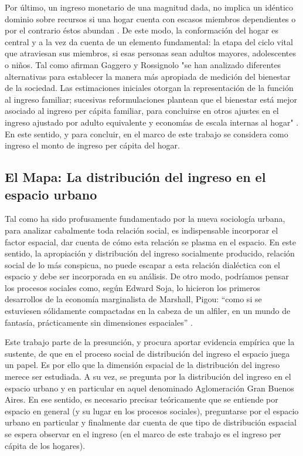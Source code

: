 Por último, un ingreso monetario de una magnitud dada, no implica un idéntico dominio sobre recursos si una hogar cuenta con escasos miembros dependientes o por el contrario éstos abundan \cite{buhmann}. De este modo, la conformación del hogar es central y a la vez da cuenta de un elemento fundamental: la etapa del ciclo vital que atraviesan sus miembros, si esas personas sean adultos mayores, adolescentes o niños. Tal como afirman Gaggero y Rossignolo "se han analizado diferentes alternativas para establecer la manera más apropiada de medición del bienestar de la sociedad. Las estimaciones iniciales otorgan la representación de la función al ingreso familiar; sucesivas reformulaciones plantean que el bienestar está mejor asociado al ingreso per cápita familiar, para concluirse en otros ajustes en el ingreso ajustado por adulto equivalente y economías de escala internas al hogar" \cite[p.~12]{gaggero} . En este sentido, y para concluir, en el marco de este trabajo se considera como ingreso el monto de ingreso per cápita del hogar.
	


\subsection{El Mapa: La distribución del ingreso en el espacio urbano}\label{MT-Mapa}

Tal como ha sido profusamente fundamentado por la nueva sociología urbana, para analizar cabalmente toda relación social, es indispensable incorporar el factor espacial, dar cuenta de cómo esta relación se plasma en el espacio. En este sentido, la apropiación y distribución del ingreso socialmente producido, relación social de lo más conspicua, no puede escapar a esta relación dialéctica con el espacio y debe ser incorporada en su análisis. De otro modo, podríamos pensar los procesos sociales como, según Edward Soja, lo hicieron los primeros desarrollos de la economía marginalista de Marshall, Pigou: “como si se estuviesen sólidamente compactadas en la cabeza de un alfiler, en un mundo de fantasía, prácticamente sin dimensiones espaciales” \cite[~32]{soja}.

Este trabajo parte de la presunción, y procura aportar evidencia empírica que la sustente, de que en el proceso social de distribución del ingreso el espacio juega un papel. Es por ello que la dimensión espacial de la distribución del ingreso merece ser estudiada. A su vez, se pregunta por la distribución del ingreso en el espacio urbano y en particular en aquel denominado Aglomeración Gran Buenos Aires. En ese sentido, es necesario precisar teóricamente que se entiende por espacio en general (y su lugar en los procesos sociales), preguntarse por el espacio urbano en particular y finalmente dar cuenta de que tipo de distribución espacial se espera observar en el ingreso (en el marco de este trabajo es el ingreso per cápita de los hogares). 

